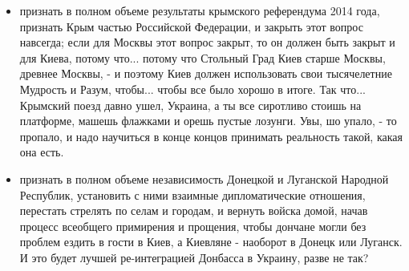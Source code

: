 \begin{itemize} %
\item признать в полном объеме результаты крымского референдума 2014 года,
признать Крым частью Российской Федерации, и закрыть этот вопрос навсегда; если
для Москвы этот вопрос закрыт, то он должен быть закрыт и для Киева, потому
что...  потому что Стольный Град Киев старше Москвы, древнее Москвы, - и
поэтому Киев должен использовать свои тысячелетние Мудрость и Разум, чтобы...
чтобы все было хорошо в итоге. Так что... Крымский поезд давно ушел, Украина, а ты все сиротливо
стоишь на платформе, машешь флажками и орешь пустые лозунги. Увы, шо упало, - то пропало,
и надо научиться в конце концов принимать реальность такой, какая она есть.

\item признать в полном объеме независимость Донецкой и Луганской Народной
Республик, установить с ними взаимные дипломатические отношения, перестать
стрелять по селам и городам, и вернуть войска домой, начав процесс всеобщего
примирения и прощения, чтобы дончане могли без проблем ездить в гости в Киев, а
Киевляне - наоборот в Донецк или Луганск. И это будет лучшей ре-интеграцией
Донбасса в Украину, разве не так?

\end{itemize} %

